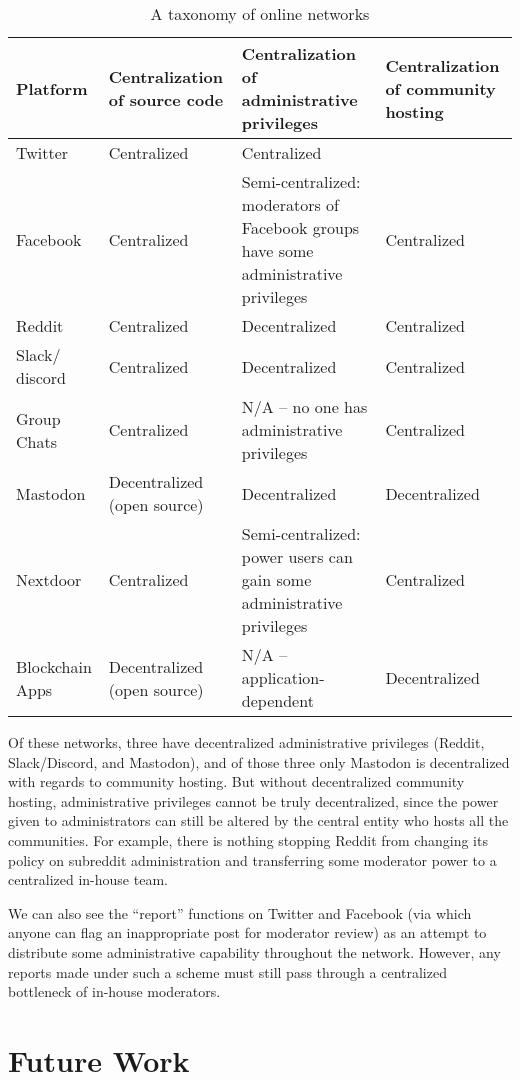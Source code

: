 \documentclass[sigconf,authordraft]{acmart}
\begin{document}
\begin{table*}
  \caption{A taxonomy of online networks}
  \label{tab:taxonomy}
  \begin{tabularx}{\textwidth}{llXX}
    \toprule
    Platform & Centralization of source code & Centralization of administrative privileges & Centralization of community hosting \\
    \midrule
    Twitter  & Centralized & Centralized\\
    Facebook & Centralized & Semi-centralized: moderators of Facebook groups have some administrative privileges & Centralized\\
    Reddit   & Centralized & Decentralized & Centralized  \\
    Slack/ discord & Centralized & Decentralized & Centralized \\
    Group Chats & Centralized & N/A -- no one has administrative privileges & Centralized \\
    Mastodon & Decentralized (open source) & Decentralized & Decentralized\\
    Nextdoor & Centralized & Semi-centralized: power users can gain some administrative privileges & Centralized \\
    Blockchain Apps & Decentralized (open source) & N/A -- application-dependent & Decentralized\\
    \bottomrule
  \end{tabularx}
\end{table*}

Of these networks, three have decentralized administrative privileges (Reddit, Slack/Discord, and Mastodon), and of those three only Mastodon is decentralized with regards to community hosting. But without decentralized community hosting, administrative privileges cannot be truly decentralized, since the power given to administrators can still be altered by the central entity who hosts all the communities. For example, there is nothing stopping Reddit from changing its policy on subreddit administration and transferring some moderator power to a centralized in-house team.

We can also see the ``report'' functions on Twitter and Facebook (via which anyone can flag an inappropriate post for moderator review) as an attempt to distribute some administrative capability throughout the network. However, any reports made under such a scheme must still pass through a centralized bottleneck of in-house moderators. 

\section{Future Work}
\end{document}
